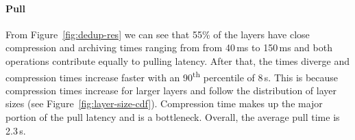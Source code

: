 \paragraph{Pull} 

From Figure~\ref{fig:dedup-res}
we can see that 55\% of the layers have close compression and archiving
times ranging from from 40\,ms to 150\,ms and both operations contribute equally
to pulling latency.
%
%
%
After that, the times diverge and compression times increase faster with an
90\textsuperscript{th} percentile of 8\,s.
%
This is because compression times increase for larger layers and follow the distribution
of layer sizes (see Figure~\ref{fig:layer-size-cdf}).
%
%
Compression time makes up the major portion of the pull latency and is a
bottleneck.
%
Overall, the average pull time is 2.3\,s.

%
